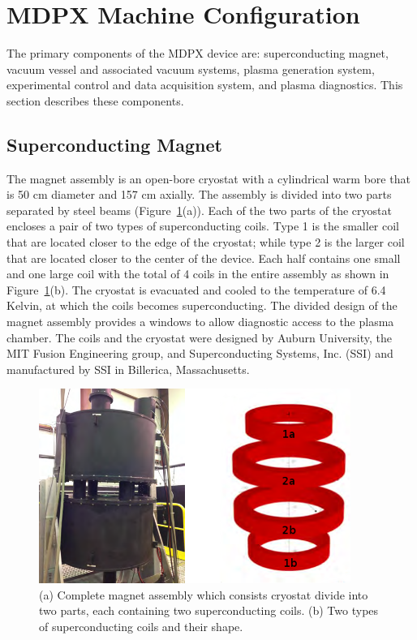 

\section{MDPX Machine Configuration}\label{section-mdpx-config}


The primary components of the MDPX device are: superconducting magnet, vacuum vessel and associated vacuum systems, plasma generation system, experimental control and data acquisition system, and plasma diagnostics. This section describes these components.

\subsection{Superconducting Magnet}

The magnet assembly is  an open-bore cryostat with a cylindrical warm bore that is 50 cm diameter and 157 cm axially. The assembly is divided into two parts separated by steel beams (Figure~\ref{coil-layout}(a)). Each of the two parts of the cryostat encloses a pair of two types of superconducting coils. Type 1 is the smaller coil that are located closer to the edge of the cryostat; while type 2 is the larger coil that are located closer to the center of the device. Each half contains one small and one large coil with the total of 4 coils in the entire assembly as shown in Figure~\ref{coil-layout}(b). The cryostat is evacuated and cooled to the temperature of 6.4 Kelvin, at which the coils becomes superconducting. The divided design of the magnet assembly provides a windows to allow diagnostic access to the plasma chamber. The coils and the cryostat were designed by Auburn University, the MIT Fusion Engineering group, and Superconducting Systems, Inc. (SSI) and manufactured by SSI in Billerica, Massachusetts.

\begin{figure}[h]
\begin{center}
\includegraphics[width=4in]{figures/magnet_assembly.png}
\caption{(a) Complete magnet assembly which consists cryostat divide into two parts, each containing two superconducting coils. (b) Two types of superconducting coils and their shape\cite{PLA:9579370}.\label{coil-layout}}
\end{center}
\end{figure}

